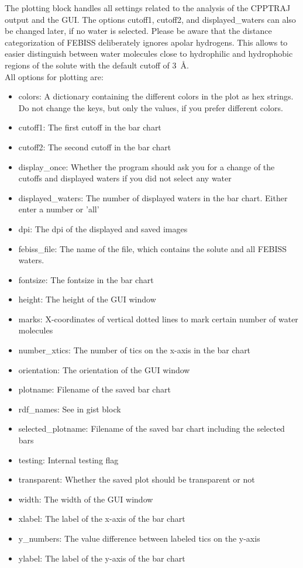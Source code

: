 \documentclass[12pt]{scrartcl} %
\begin{document}
The plotting block handles all settings related to the analysis of the CPPTRAJ output and the GUI. The options cutoff1, cutoff2, and displayed\_waters can also be changed later, if no water is selected. Please be aware that the distance categorization of FEBISS deliberately ignores apolar hydrogens. This allows to easier distinguish between water molecules close to hydrophilic and hydrophobic regions of the solute with the default cutoff of \SI{3}{\angstrom}.\\
All options for plotting are:
\begin{itemize}
	\item colors: A dictionary containing the different colors in the plot as hex strings. Do	not change the keys, but only the values, if you prefer different colors.
	\item cutoff1: The first cutoff in the bar chart
	\item cutoff2: The second cutoff in the bar chart
	\item display\_once: Whether the program should ask you for a change of the cutoffs	and displayed waters if you did not select any water
	\item displayed\_waters: The number of displayed waters in the bar chart. Either enter a number or 'all'
	\item dpi: The dpi of the displayed and saved images
	\item febiss\_file: The name of the file, which contains the solute and all FEBISS waters.
	\item fontsize: The fontsize in the bar chart
	\item height: The height of the GUI window
	\item marks: X-coordinates of vertical dotted lines to mark certain number of water molecules
	\item number\_xtics: The number of tics on the x-axis in the bar chart
	\item orientation: The orientation of the GUI window
	\item plotname: Filename of the saved bar chart
	\item rdf\_names: See in gist block
	\item selected\_plotname: Filename of the saved bar chart including the selected bars
	\item testing: Internal testing flag
	\item transparent: Whether the saved plot should be transparent or not
	\item width: The width of the GUI window
	\item xlabel: The label of the x-axis of the bar chart
	\item y\_numbers: The value difference between labeled tics on the y-axis
	\item ylabel: The label of the y-axis of the bar chart
\end{itemize}
\end{document}
